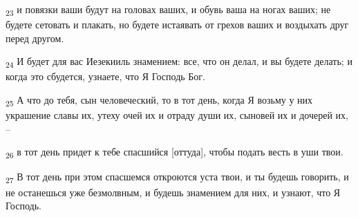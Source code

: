 \begin{tcolorbox}
\textsubscript{23} и повязки ваши будут на головах ваших, и обувь ваша на ногах ваших; не будете сетовать и плакать, но будете истаявать от грехов ваших и воздыхать друг перед другом.
\end{tcolorbox}
\begin{tcolorbox}
\textsubscript{24} И будет для вас Иезекииль знамением: все, что он делал, и вы будете делать; и когда это сбудется, узнаете, что Я Господь Бог.
\end{tcolorbox}
\begin{tcolorbox}
\textsubscript{25} А что до тебя, сын человеческий, то в тот день, когда Я возьму у них украшение славы их, утеху очей их и отраду души их, сыновей их и дочерей их, --
\end{tcolorbox}
\begin{tcolorbox}
\textsubscript{26} в тот день придет к тебе спасшийся [оттуда], чтобы подать весть в уши твои.
\end{tcolorbox}
\begin{tcolorbox}
\textsubscript{27} В тот день при этом спасшемся откроются уста твои, и ты будешь говорить, и не останешься уже безмолвным, и будешь знамением для них, и узнают, что Я Господь.
\end{tcolorbox}
